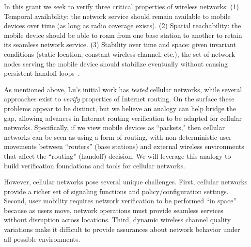 In this grant we seek to verify three critical properties of wireless networks:
(1) Temporal availability: the network service should remain available to mobile devices over time (as long as radio coverage exists). 
(2) Spatial reachability: the mobile device should be able to roam from one base station to another to retain its seamless network service.
(3) Stability over time and space: given invariant conditions (static location, constant wireless channel, etc.), the set of network nodes serving the mobile device should stabilize eventually without causing persistent handoff loops~\cite{li2016instability}.

As mentioned above, Lu's initial work has {\em tested} cellular networks, while several approaches exist to {\em verify} properties of Internet routing.   On the surface these problems appear to be distinct, but we believe an analogy can help bridge the gap, allowing advances in Internet routing verification to be adapted for cellular networks. Specifically, if we view mobile devices as ``packets," then cellular networks can be seen as using a form of routing,  with non-deterministic user movements between ``routers'' (base stations) and external wireless environments that affect the ``routing'' (handoff) decision.  We will leverage this analogy to build verification foundations and tools for cellular networks.

However, cellular networks pose several unique challenges.  First, cellular networks provide a richer set of signaling functions and policy/configuration settings. Second, user mobility requires network verification to be performed ``in space'' because as users move, network operations must provide seamless services without disruption across locations. Third, dynamic wireless channel quality variations make it difficult to provide assurances about network behavior under all possible environments.


